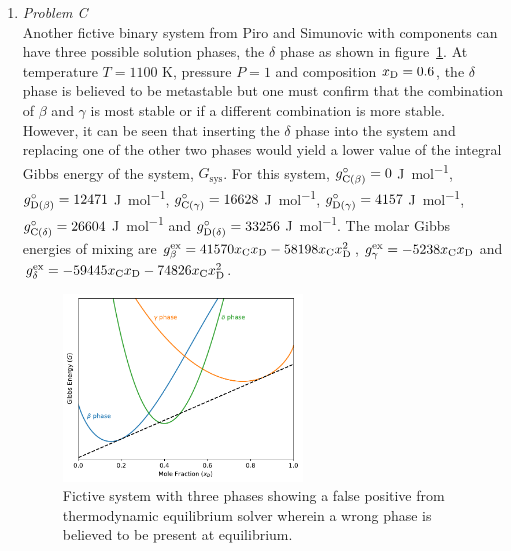 \begin{enumerate}
	\item	\emph{Problem C}\\
		Another fictive binary system from Piro and Simunovic \cite{Piro16} with components  can have three possible solution phases, the $\delta$ phase as shown in figure~\ref{fig:testC}. At  temperature  $T = 1100$ \si{\kelvin}, pressure $P=1$ \si{\atmosphere} and composition $x_{\ce{D}} = 0.6$, the $\delta$ phase is believed to be metastable but one must confirm that the combination of $\beta$ and $\gamma$ is most stable or if a different combination is more stable. However, it can be seen that inserting the $\delta$ phase into the system and replacing one of the other two phases would yield a lower value of the integral Gibbs energy of the system, $G_\text{sys}$. For this system, $g_{\ce{C}(\beta)}^\circ = 0$ \si{\joule \per \mole}, $g_{\ce{D}(\beta)}^\circ = 12471$ \si{\joule \per \mole}, $g_{\ce{C}(\gamma)}^\circ = 16628$ \si{\joule \per \mole}, $g_{\ce{D}(\gamma)}^\circ = 4157$ \si{\joule \per \mole}, $g_{\ce{C}(\delta)}^\circ = 26604$ \si{\joule \per \mole} and $g_{\ce{D}(\delta)}^\circ = 33256$ \si{\joule \per \mole}. The molar Gibbs energies of mixing are $g_{\beta}^\text{ex} = 41570 x_{\ce{C}} x_{\ce{D}} - 58198 x_{\ce{C}}x_{\ce{D}}^2$, $g_{\gamma}^\text{ex} = -5238 x_{\ce{C}} x_{\ce{D}}$ and $g_{\delta}^\text{ex} = -59445 x_{\ce{C}} x_{\ce{D}} - 74826 x_{\ce{C}}x_{\ce{D}}^2$.
		\begin{figure}[htbp]
			\centering
			\includegraphics[width=0.6\textwidth]{figures/chapter-6/System_CD.pdf}
			\caption[Global optimisation test problem C: Fictive system with three phases showing a false positive from thermodynamic equilibrium solver wherein a wrong phase is believed to be present at equilibrium.]{Fictive system with three phases showing a false positive from thermodynamic equilibrium solver wherein a wrong phase is believed to be present at equilibrium.}
			\label{fig:testC}
		\end{figure}
	

\end{enumerate}

